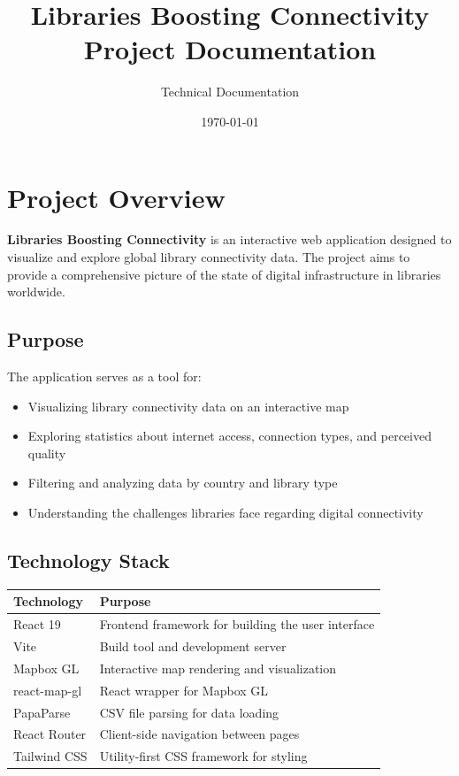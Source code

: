 \documentclass[11pt,a4paper]{article}
\title{\textbf{Libraries Boosting Connectivity}\\[0.5em]\large Project Documentation}
\author{Technical Documentation}
\date{\today}
\begin{document}
\maketitle
\tableofcontents
\newpage

\section{Project Overview}

\textbf{Libraries Boosting Connectivity} is an interactive web application designed to visualize and explore global library connectivity data. The project aims to provide a comprehensive picture of the state of digital infrastructure in libraries worldwide.

\subsection{Purpose}

The application serves as a tool for:
\begin{itemize}
    \item Visualizing library connectivity data on an interactive map
    \item Exploring statistics about internet access, connection types, and perceived quality
    \item Filtering and analyzing data by country and library type
    \item Understanding the challenges libraries face regarding digital connectivity
\end{itemize}

\subsection{Technology Stack}

\begin{longtable}{|p{4cm}|p{10cm}|}
\hline
\textbf{Technology} & \textbf{Purpose} \\
\hline
React 19 & Frontend framework for building the user interface \\
\hline
Vite & Build tool and development server \\
\hline
Mapbox GL & Interactive map rendering and visualization \\
\hline
react-map-gl & React wrapper for Mapbox GL \\
\hline
PapaParse & CSV file parsing for data loading \\
\hline
React Router & Client-side navigation between pages \\
\hline
Tailwind CSS & Utility-first CSS framework for styling \\
\hline
\end{longtable}
\end{document}
